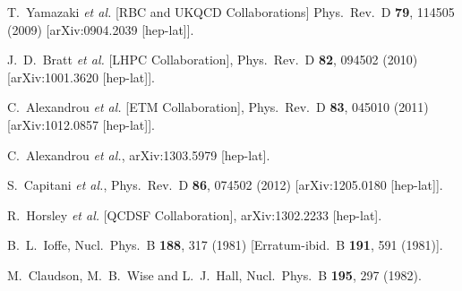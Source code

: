 \begin{thebibliography}{99}
  T.~Yamazaki {\it et al.} [RBC and UKQCD Collaborations]
  Phys.\ Rev.\ D {\bf 79}, 114505 (2009)
  [arXiv:0904.2039 [hep-lat]].
  
  J.~D.~Bratt {\it et al.}  [LHPC Collaboration],
  Phys.\ Rev.\ D {\bf 82}, 094502 (2010)
  [arXiv:1001.3620 [hep-lat]].

  C.~Alexandrou {\it et al.}  [ETM Collaboration],
  Phys.\ Rev.\ D {\bf 83}, 045010 (2011)
  [arXiv:1012.0857 [hep-lat]].

  C.~Alexandrou {\it et al.},
  arXiv:1303.5979 [hep-lat].
  
  S.~Capitani {\it et al.},
  Phys.\ Rev.\ D {\bf 86}, 074502 (2012)
  [arXiv:1205.0180 [hep-lat]].

  R.~Horsley {\it et al.} [QCDSF Collaboration],
  arXiv:1302.2233 [hep-lat].
  
  B.~L.~Ioffe,
  Nucl.\ Phys.\ B {\bf 188}, 317 (1981)
  [Erratum-ibid.\ B {\bf 191}, 591 (1981)].
  
  M.~Claudson, M.~B.~Wise and L.~J.~Hall,
  Nucl.\ Phys.\ B {\bf 195}, 297 (1982).
  

\end{thebibliography}
